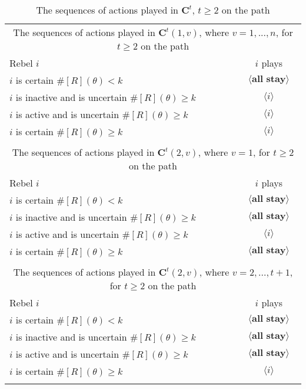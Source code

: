 \documentclass[12pt,letter]{article}
\newcommand{\Kappa}{\mathbf{C}}
\theoremstyle{definition}
\theoremstyle{remark}
\theoremstyle{claim}
\begin{document}
\begin{table}[!htbp]
\caption{The sequences of actions played in $\Kappa^t$, $t\geq 2$ on the path}
\label{Table_cdt}
\begin{center}
\begin{tabular}{l c}
\multicolumn{2}{c}{The sequences of actions played in $\Kappa^t(1,v)$, where $v=1,...,n$, for $t\geq 2$ on the path}\\
Rebel $i$ 	 	&  	$i$ plays		 \\
\hline
\hline
$i$ is certain $\#[R](\theta)<k$ 	& 	$\langle \textbf{all stay} \rangle$	\\
$i$ is inactive and is uncertain $\#[R](\theta)\geq k$	& 	$\langle i \rangle$	\\
$i$ is active and is uncertain $\#[R](\theta)\geq k$ &  $\langle i \rangle$  \\
$i$ is certain $\#[R](\theta)\geq k$ &  $\langle i \rangle$  \\
\hline
\\
\multicolumn{2}{c}{The sequences of actions played in $\Kappa^t(2,v)$, where $v=1$, for $t\geq 2$ on the path}\\
Rebel $i$ 	 	&  	$i$ plays		 \\
\hline
\hline
$i$ is certain $\#[R](\theta)<k$ 	& 	$\langle \textbf{all stay} \rangle$	\\
$i$ is inactive and is uncertain $\#[R](\theta)\geq k$	& 	$\langle \textbf{all stay} \rangle$	\\
$i$ is active and is uncertain $\#[R](\theta)\geq k$ &  $\langle i \rangle$  \\
$i$ is certain $\#[R](\theta)\geq k$ &  $\langle \textbf{all stay} \rangle$  \\
\hline
\\
\multicolumn{2}{c}{The sequences of actions played in $\Kappa^t(2,v)$, where $v=2,...,t+1$, for $t\geq 2$ on the path}\\
Rebel $i$ 	 	&  	$i$ plays		 \\
\hline
\hline
$i$ is certain $\#[R](\theta)<k$ 	& 	$\langle \textbf{all stay} \rangle$	\\
$i$ is inactive and is uncertain $\#[R](\theta)\geq k$	& 	$\langle \textbf{all stay} \rangle$	\\
$i$ is active and is uncertain $\#[R](\theta)\geq k$ &  $\langle \textbf{all stay} \rangle$  \\
$i$ is certain $\#[R](\theta)\geq k$ &  $\langle i \rangle$  \\
\hline
\\

\end{tabular}
\end{center}
\end{table}
\end{document}
